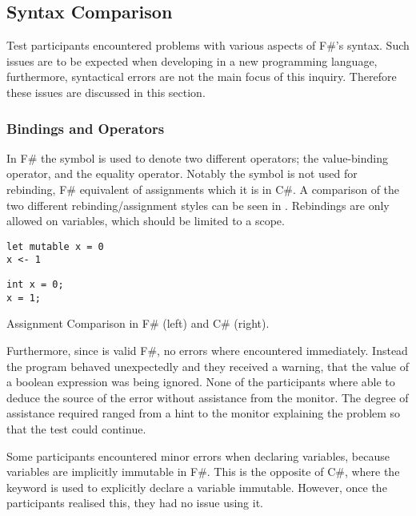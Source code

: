 \subsection{Syntax Comparison}
Test participants encountered problems with various aspects of F\#'s syntax. Such issues are to be expected when developing in a new programming language, furthermore, syntactical errors are not the main focus of this inquiry. Therefore these issues are discussed in this section.

\subsubsection{Bindings and Operators}
In F\# the \ttt{=} symbol is used to denote two different operators; the value-binding operator, and the equality operator. Notably the symbol is not used for rebinding, F\# equivalent of assignments which it is in C\#. A comparison of the two different rebinding/assignment styles can be seen in . Rebindings are only allowed on  variables, which should be limited to a scope.

\begin{listing}[H]
\begin{minipage}{.45\textwidth}
\begin{verbatim}
let mutable x = 0
x <- 1
\end{verbatim}
\end{minipage}
\hfill
\begin{minipage}{.45\textwidth}
\begin{verbatim}
int x = 0;
x = 1;
\end{verbatim}
\end{minipage}
\caption{Assignment Comparison in F\# (left) and C\# (right).}
\label{lst:ass-comp}
\end{listing}

Furthermore, since  is valid F\#, no errors where encountered immediately. Instead the program behaved unexpectedly and they received a warning, that the value of a boolean expression was being ignored. None of the participants where able to deduce the source of the error without assistance from the monitor. The degree of assistance required ranged from a hint to the monitor explaining the problem so that the test could continue.

Some participants encountered minor errors when declaring variables, because variables are implicitly immutable in F\#. This is the opposite of C\#, where the  keyword is used to explicitly declare a variable immutable. However, once the participants realised this, they had no issue using it.

